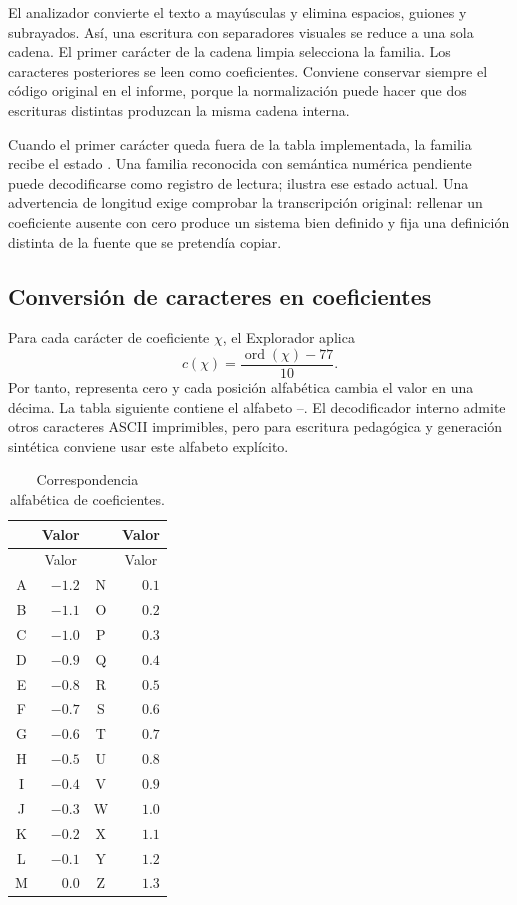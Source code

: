 El analizador convierte el texto a mayúsculas y elimina espacios, guiones y
subrayados. Así, una escritura con separadores visuales se reduce a una sola cadena.
El primer carácter de la cadena limpia selecciona la familia. Los caracteres
posteriores se leen como coeficientes. Conviene conservar siempre el código original
en el informe, porque la normalización puede hacer que dos escrituras distintas
produzcan la misma cadena interna.

Cuando el primer carácter queda fuera de la tabla implementada, la familia recibe el estado
. Una familia reconocida con semántica numérica pendiente puede decodificarse como registro de lectura;  ilustra ese estado actual. Una
advertencia de longitud exige comprobar la transcripción original: rellenar un
coeficiente ausente con cero produce un sistema bien definido y fija una definición distinta de la fuente que se pretendía copiar.

\subsection{Conversión de caracteres en coeficientes}

Para cada carácter de coeficiente \(\chi\), el Explorador aplica
\[
 c(\chi)=\frac{\operatorname{ord}(\chi)-77}{10}.
\]
Por tanto,  representa cero y cada posición alfabética cambia el valor en
una décima. La tabla siguiente contiene el alfabeto --. El
decodificador interno admite otros caracteres ASCII imprimibles, pero para escritura
pedagógica y generación sintética conviene usar este alfabeto explícito.

\begin{longtable}{>{\ttfamily}c r >{\ttfamily}c r}
\caption{Correspondencia alfabética de coeficientes.}\\
\toprule
\multicolumn{1}{c}{Carácter} & \multicolumn{1}{c}{Valor} &
\multicolumn{1}{c}{Carácter} & \multicolumn{1}{c}{Valor}\\
\midrule
\endfirsthead
\toprule
\multicolumn{1}{c}{Carácter} & \multicolumn{1}{c}{Valor} &
\multicolumn{1}{c}{Carácter} & \multicolumn{1}{c}{Valor}\\
\midrule
\endhead
A & \(-1.2\) & N & \(0.1\)\\
B & \(-1.1\) & O & \(0.2\)\\
C & \(-1.0\) & P & \(0.3\)\\
D & \(-0.9\) & Q & \(0.4\)\\
E & \(-0.8\) & R & \(0.5\)\\
F & \(-0.7\) & S & \(0.6\)\\
G & \(-0.6\) & T & \(0.7\)\\
H & \(-0.5\) & U & \(0.8\)\\
I & \(-0.4\) & V & \(0.9\)\\
J & \(-0.3\) & W & \(1.0\)\\
K & \(-0.2\) & X & \(1.1\)\\
L & \(-0.1\) & Y & \(1.2\)\\
M & \(0.0\) & Z & \(1.3\)\\
\bottomrule
\end{longtable}

